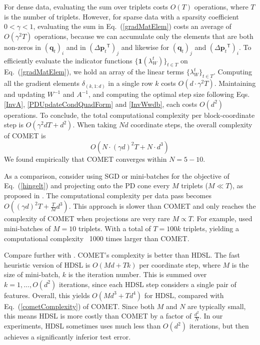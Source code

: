\documentclass{article} %
\newcommand\mat[1]{{#1}}
\renewcommand\vec[1]{\mathbf{#1}}
\newcommand{\T}{{}^\mathsf{T}}
\newcommand{\W}{\mat{W}}
\newcommand{\invA}{A^{-1}}
\renewcommand{\eqref}[1]{Eq.~(\ref{#1})}
\begin{document}
For dense data, evaluating the sum over triplets costs $O(T)$ operations, where $T$ is the number of triplets. However, for sparse data with a sparsity coefficient $ 0< \gamma <1 $, evaluating the sum in \eqref{gradMatElem} costs an average of $O(\gamma^2 T)$ operations, because we can accumulate only the elements that are both non-zeros in $(\vec{q}_{t})_i$ and in $(\Delta\vec{p}_{t}\T)_j  $ and likewise for $(\vec{q}_{t})_j$ and $(\Delta\vec{p}_{t}\T)_i$.   To efficiently evaluate the indicator functions $\{ \textbf{1}(\lambda_{W}^t) \}_{t \in T}$ on \eqref{gradMatElem}, we hold an array of the linear terms $\{\lambda_{W}^t\}_{t \in T}$. Computing all the gradient elements $\delta_{(k,1:d)}$ in a single row $k$ costs $O(d\cdot \gamma^2 T)$.
Maintaining and updating $\W^{-1}$ and $\invA$, and computing the optimal step size following Eqs. \ref{InvA}, \ref{PDUpdateCondQuadForm} and \ref{InvWwdb}, each costs $O(d^2)$ operations. 
To conclude, the total computational complexity per block-coordinate step is $O(\gamma^2 d T + d^2)$. When taking $Nd$ coordinate steps, the overall complexity of COMET is 
\begin{equation}
O(N \cdot (\gamma d)^2 T + N \cdot d^3)
\label{cometComplexity}
\end{equation}
We found empirically that COMET converges within $N= 5 - 10$.

As a comparison, consider using SGD or mini-batches for the objective of \eqref{hingelt} and projecting onto the PD cone every $M$ triplets ($M \ll T$), as proposed in \cite{OASIS,qian}. The computational complexity per data pass becomes $O((\gamma d)^2 T + \frac{T}{M} d^3)$. This approach is slower than COMET and only reaches the complexity of COMET when projections are very rare $M \propto T$. For example, \citet{qian} used mini-batches of $M=10$ triplets. With a total of $T=100k$ triplets, yielding a computational complexity ~1000 times larger than COMET.

Compare further with \citet{hdsl}. COMET’s complexity is better than HDSL. The fast heuristic version of HDSL is $O(Md+Tk)$ per coordinate step, where $M$ is the size of mini-batch, $k$ is the iteration number. This is summed over $k=1,...,O(d^2)$ iterations, since each HDSL step considers a single pair of features. Overall, this yields $O(Md^3+Td^4)$ for HDSL, compared with \eqref{cometComplexity} of COMET. Since both $M$ and $N$ are typically small, this means HDSL is more costly than COMET by a factor of $\frac{d^2}{N}$. In our experiments, HDSL sometimes uses much less than $O(d^2)$ iterations, but then achieves a significantly inferior test error.
\end{document}
